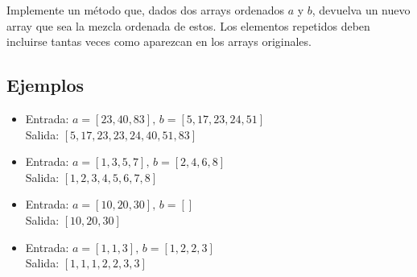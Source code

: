 Implemente un método que, dados dos arrays ordenados \(a\) y \(b\), devuelva un nuevo array que sea la mezcla ordenada de estos. Los elementos repetidos deben incluirse tantas veces como aparezcan en los arrays originales.

\subsection*{Ejemplos}

\begin{itemize}
    \item Entrada: \(a = [23, 40, 83], \, b = [5, 17, 23, 24, 51]\)\\
    Salida: \([5, 17, 23, 23, 24, 40, 51, 83]\)\\

    \item Entrada: \(a = [1, 3, 5, 7], \, b = [2, 4, 6, 8]\)\\
    Salida: \([1, 2, 3, 4, 5, 6, 7, 8]\)\\

    \item Entrada: \(a = [10, 20, 30], \, b = []\)\\
    Salida: \([10, 20, 30]\)\\

    \item Entrada: \(a = [1, 1, 3], \, b = [1, 2, 2, 3]\)\\
    Salida: \([1, 1, 1, 2, 2, 3, 3]\)\\
\end{itemize}
